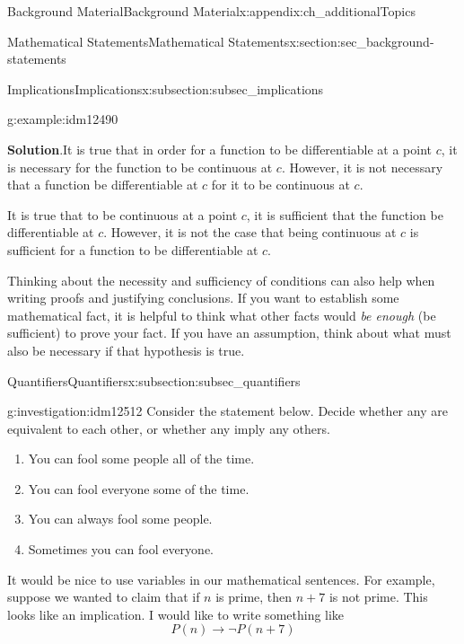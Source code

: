 \documentclass[oneside,10pt,]{book}
\numberwithin{equation}{chapter}
\def\imp{\rightarrow}
\begin{document}
\begin{appendixptx}{Background Material}{}{Background Material}{}{}{x:appendix:ch_additionalTopics}
\begin{sectionptx}{Mathematical Statements}{}{Mathematical Statements}{}{}{x:section:sec_background-statements}
\begin{subsectionptx}{Implications}{}{Implications}{}{}{x:subsection:subsec_implications}
\begin{example}{}{g:example:idm12490}
\par\smallskip%
\noindent\textbf{Solution}.\hypertarget{g:solution:idm12497}{}\quad{}It is true that in order for a function to be differentiable at a point \(c\), it is necessary for the function to be continuous at \(c\). However, it is not necessary that a function be differentiable at \(c\) for it to be continuous at \(c\).%
\par
It is true that to be continuous at a point \(c\), it is sufficient that the function be differentiable at \(c\). However, it is not the case that being continuous at \(c\) is sufficient for a function to be differentiable at \(c\).%
\end{example}
Thinking about the necessity and sufficiency of conditions can also help when writing proofs and justifying conclusions. If you want to establish some mathematical fact, it is helpful to think what other facts would \emph{be enough} (be sufficient) to prove your fact. If you have an assumption, think about what must also be necessary if that hypothesis is true.%
\end{subsectionptx}
%
%
\typeout{************************************************}
\typeout{************************************************}
%
\begin{subsectionptx}{Quantifiers}{}{Quantifiers}{}{}{x:subsection:subsec_quantifiers}
\begin{investigation}{}{g:investigation:idm12512}%
Consider the statement below. Decide whether any are equivalent to each other, or whether any imply any others.%
\par
%
\begin{enumerate}
\item{}You can fool some people all of the time.%
\item{}You can fool everyone some of the time.%
\item{}You can always fool some people.%
\item{}Sometimes you can fool everyone.%
\end{enumerate}
%
\end{investigation}
It would be nice to use variables in our mathematical sentences. For example, suppose we wanted to claim that if \(n\) is prime, then \(n+7\) is not prime. This looks like an implication. I would like to write something like%
\begin{equation*}
P(n) \imp \neg P(n+7) 
\end{equation*}

\end{subsectionptx}
\end{sectionptx}
\end{appendixptx}
\end{document}
